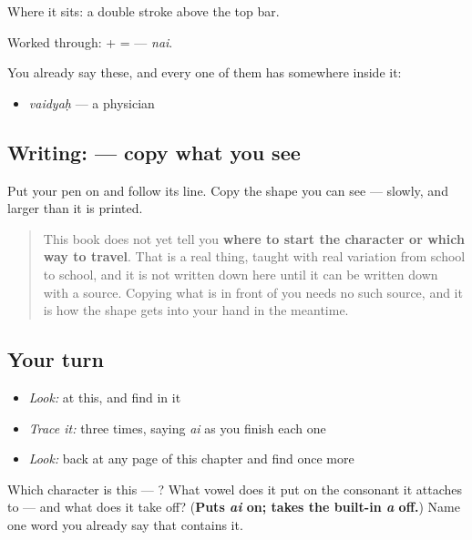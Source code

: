 Where it sits: a double stroke above the top bar.

Worked through: \textbf{} + \textbf{} = \textbf{} — \emph{nai}.

You already say these, and every one of them has  somewhere inside it:

\begin{itemize}
\raggedright
  \item \textbf{} \emph{vaidyaḥ} — a physician
\end{itemize}

\subsection*{Writing:  — copy what you see}
Put your pen on  and follow its line. Copy the shape you can see — slowly, and larger than it is printed.

\begin{quote}
This book does not yet tell you \textbf{where to start the character or which way to travel}. That is a real thing, taught with real variation from school to school, and it is not written down here until it can be written down with a source. Copying what is in front of you needs no such source, and it is how the shape gets into your hand in the meantime.
\end{quote}

\subsection*{Your turn}
\begin{itemize}
\raggedright
  \item \emph{Look:} at this, and find  in it
\end{itemize}

\begin{quote}
\end{quote}

\begin{itemize}
\raggedright
  \item \emph{Trace it:}  three times, saying \emph{ai} as you finish each one
  \item \emph{Look:} back at any page of this chapter and find  once more
\end{itemize}

\begin{tcolorbox}[breakable,colback=teal!4,colframe=teal!35!black,title={Before you move on}]
Which character is this — ? What vowel does it put on the consonant it attaches to — and what does it take off? (\textbf{Puts \emph{ai} on; takes the built-in \emph{a} off.}) Name one word you already say that contains it.
\end{tcolorbox}
